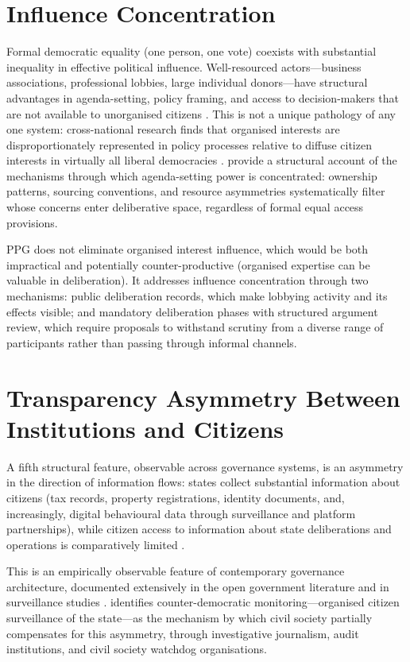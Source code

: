 \documentclass[12pt,a4paper,oneside]{report}
\begin{document}
\section{Influence Concentration}

Formal democratic equality (one person, one vote) coexists with substantial inequality in effective political influence. Well-resourced actors---business associations, professional lobbies, large individual donors---have structural advantages in agenda-setting, policy framing, and access to decision-makers that are not available to unorganised citizens \citep{schlozman2012unheavenly}. This is not a unique pathology of any one system: cross-national research finds that organised interests are disproportionately represented in policy processes relative to diffuse citizen interests in virtually all liberal democracies \citep{norris2011democratic}. \citet{herman1988manufacturing} provide a structural account of the mechanisms through which agenda-setting power is concentrated: ownership patterns, sourcing conventions, and resource asymmetries systematically filter whose concerns enter deliberative space, regardless of formal equal access provisions.

PPG does not eliminate organised interest influence, which would be both impractical and potentially counter-productive (organised expertise can be valuable in deliberation). It addresses influence concentration through two mechanisms: public deliberation records, which make lobbying activity and its effects visible; and mandatory deliberation phases with structured argument review, which require proposals to withstand scrutiny from a diverse range of participants rather than passing through informal channels.

\section{Transparency Asymmetry Between Institutions and Citizens}

A fifth structural feature, observable across governance systems, is an asymmetry in the direction of information flows: states collect substantial information about citizens (tax records, property registrations, identity documents, and, increasingly, digital behavioural data through surveillance and platform partnerships), while citizen access to information about state deliberations and operations is comparatively limited \citep{zuboff2019surveillance}.

This is an empirically observable feature of contemporary governance architecture, documented extensively in the open government literature \citep{oecd2020open} and in surveillance studies \citep{zuboff2019surveillance}. \citet{rosanvallon2008counter} identifies counter-democratic monitoring---organised citizen surveillance of the state---as the mechanism by which civil society partially compensates for this asymmetry, through investigative journalism, audit institutions, and civil society watchdog organisations.
\end{document}
